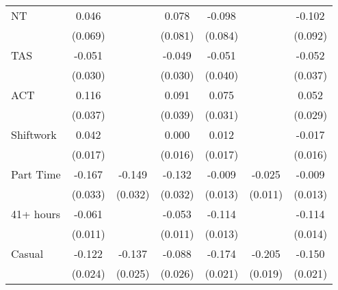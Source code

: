 {\begin{tabular}{l*{6}{c}}
NT                  &       0.046         &                     &       0.078         &      -0.098         &                     &      -0.102         \\
                    &     (0.069)         &                     &     (0.081)         &     (0.084)         &                     &     (0.092)         \\
TAS                 &      -0.051\sym{*}  &                     &      -0.049\sym{*}  &      -0.051         &                     &      -0.052         \\
                    &     (0.030)         &                     &     (0.030)         &     (0.040)         &                     &     (0.037)         \\
ACT                 &       0.116\sym{***}&                     &       0.091\sym{**} &       0.075\sym{**} &                     &       0.052\sym{*}  \\
                    &     (0.037)         &                     &     (0.039)         &     (0.031)         &                     &     (0.029)         \\
Shiftwork           &       0.042\sym{**} &                     &       0.000         &       0.012         &                     &      -0.017         \\
                    &     (0.017)         &                     &     (0.016)         &     (0.017)         &                     &     (0.016)         \\
Part Time           &      -0.167\sym{***}&      -0.149\sym{***}&      -0.132\sym{***}&      -0.009         &      -0.025\sym{**} &      -0.009         \\
                    &     (0.033)         &     (0.032)         &     (0.032)         &     (0.013)         &     (0.011)         &     (0.013)         \\
41+ hours           &      -0.061\sym{***}&                     &      -0.053\sym{***}&      -0.114\sym{***}&                     &      -0.114\sym{***}\\
                    &     (0.011)         &                     &     (0.011)         &     (0.013)         &                     &     (0.014)         \\
Casual              &      -0.122\sym{***}&      -0.137\sym{***}&      -0.088\sym{***}&      -0.174\sym{***}&      -0.205\sym{***}&      -0.150\sym{***}\\
                    &     (0.024)         &     (0.025)         &     (0.026)         &     (0.021)         &     (0.019)         &     (0.021)         \\

\end{tabular}}
